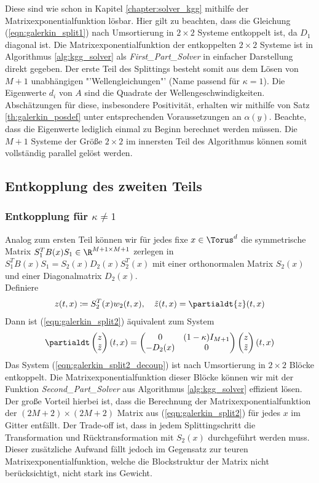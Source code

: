 Diese sind wie schon in Kapitel \ref{chapter:solver_kgg} mithilfe der Matrixexponentialfunktion lösbar. Hier gilt zu beachten, dass die Gleichung (\ref{eqn:galerkin_split1}) nach Umsortierung in $2\times 2$ Systeme entkoppelt ist, da $D_1$ diagonal ist. Die Matrixexponentialfunktion der entkoppelten $2\times 2$ Systeme ist in Algorithmus \ref{alg:kgg_solver} als \emph{First\_Part\_Solver} in einfacher Darstellung direkt gegeben. Der erste Teil des Splittings besteht somit aus dem Lösen von $M+1$ unabhängigen "'Wellengleichungen"' (Name passend für $\kappa=1$). Die Eigenwerte $d_i$ von $A$ sind die Quadrate der Wellengeschwindigkeiten. Abschätzungen für diese, insbesondere Positivität, erhalten wir mithilfe von Satz \ref{th:galerkin_posdef} unter entsprechenden Voraussetzungen an $\alpha(y)$. Beachte, dass die Eigenwerte lediglich einmal zu Beginn berechnet werden müssen. Die $M+1$ Systeme der Größe $2\times 2$ im innersten Teil des Algorithmus können somit vollständig parallel gelöst werden.

\subsection{Entkopplung des zweiten Teils}
\subsubsection*{Entkopplung für $\kappa \neq 1$}
Analog zum ersten Teil können wir für jedes fixe $x\in\Torus^d$ die symmetrische Matrix $S_1^TB(x)S_1\in\R^{M+1\times M+1}$ zerlegen in $S_1^TB(x)S_1=S_2(x)D_2(x)S_2^T(x)$ mit einer orthonormalen Matrix $S_2(x)$ und einer Diagonalmatrix $D_2(x)$.\\
Definiere
\[z(t,x)\coloneqq S_2^T(x) w_2(t,x), \quad \tilde{z}(t,x)=\partialdt{z}(t,x)\]
Dann ist (\ref{eqn:galerkin_split2}) äquivalent zum System
\begin{equation}
\label{eqn:galerkin_split2_decoup}
\partialdt\begin{pmatrix}z\\ \tilde{z}\end{pmatrix}(t,x)=\begin{pmatrix}0&(1-\kappa)I_{M+1}\\-D_2(x) & 0\end{pmatrix}\begin{pmatrix}z\\\tilde{z}\end{pmatrix}(t,x)
\end{equation}
Das System (\ref{eqn:galerkin_split2_decoup}) ist nach Umsortierung in $2\times 2$ Blöcke entkoppelt. Die Matrixexponentialfunktion dieser Blöcke können wir mit der Funktion \emph{Second\_Part\_Solver} aus Algorithmus \ref{alg:kgg_solver} effizient lösen. Der große Vorteil hierbei ist, dass die Berechnung der Matrixexponentialfunktion der $(2M+2)\times (2M+2)$ Matrix aus (\ref{eqn:galerkin_split2}) für jedes $x$ im Gitter entfällt. Der Trade-off ist, dass in jedem Splittingschritt die Transformation und Rücktransformation mit $S_2(x)$ durchgeführt werden muss. Dieser zusätzliche Aufwand fällt jedoch im Gegensatz zur teuren Matrixexponentialfunktion, welche die Blockstruktur der Matrix nicht berücksichtigt, nicht stark ins Gewicht.
